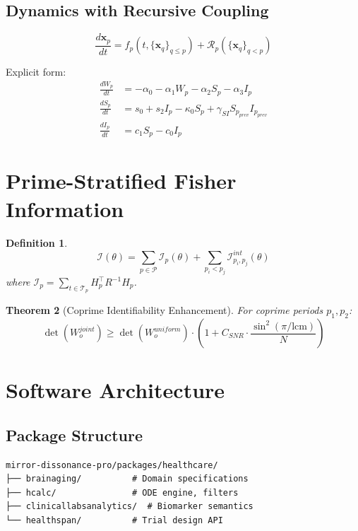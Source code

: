 \documentclass[11pt,letterpaper]{article}
\newtheorem{theorem}{Theorem}[section]
\newtheorem{definition}[theorem]{Definition}
\begin{document}
\subsection{Dynamics with Recursive Coupling}

\[
\frac{d\mathbf{x}_p}{dt} = f_p(t, \{\mathbf{x}_q\}_{q \leq p}) + \mathcal{R}_p(\{\mathbf{x}_q\}_{q < p})
\]

Explicit form:
\begin{align*}
\frac{dW_p}{dt} &= -\alpha_0 - \alpha_1 W_p - \alpha_2 S_p - \alpha_3 I_p \\
\frac{dS_p}{dt} &= s_0 + s_2 I_p - \kappa_0 S_p + \gamma_{SI} S_{p_{prev}} I_{p_{prev}} \\
\frac{dI_p}{dt} &= c_1 S_p - c_0 I_p
\end{align*}

\section{Prime-Stratified Fisher Information}

\begin{definition}
\[
\mathcal{I}(\theta) = \sum_{p \in \mathcal{P}} \mathcal{I}_p(\theta) + \sum_{p_i < p_j} \mathcal{I}_{p_i,p_j}^{int}(\theta)
\]
where $\mathcal{I}_p = \sum_{t \in \mathcal{T}_p} H_p^\top R^{-1} H_p$.
\end{definition}

\begin{theorem}[Coprime Identifiability Enhancement]
For coprime periods $p_1, p_2$:
\[
\det(W_o^{joint}) \geq \det(W_o^{uniform}) \cdot \left(1 + C_{SNR} \cdot \frac{\sin^2(\pi / \text{lcm})}{N}\right)
\]
\end{theorem}

\section{Software Architecture}

\subsection{Package Structure}

\begin{verbatim}
mirror-dissonance-pro/packages/healthcare/
├── brainaging/          # Domain specifications
├── hcalc/               # ODE engine, filters
├── clinicallabsanalytics/  # Biomarker semantics
└── healthspan/          # Trial design API
\end{verbatim}
\end{document}
